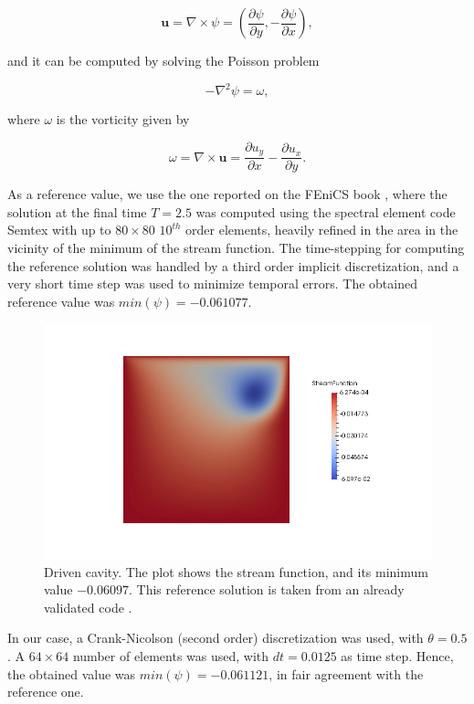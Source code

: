 \documentclass[a4paper,11pt,openright,twoside]{book}
\begin{document}
\[
\mathbf{u} = \nabla \times \psi = (\frac{\partial \psi}{\partial y} , - \frac{\partial \psi }{\partial x}),
\]

and it can be computed by solving the Poisson problem

\[
- \nabla^2 \psi = \omega,
\]

where $\omega$ is the vorticity given by

\[
\omega = \nabla \times \mathbf{u} = \frac{\partial u_y}{\partial x} - \frac{\partial u_x}{\partial y}.
\]


As a reference value, we use the one reported on the FEniCS book \cite{logg}, where the solution at the final time $T = 2.5$ was computed using the spectral element code Semtex with up to $80 \times 80$ $10^{th}$ order elements, heavily refined in the area in the vicinity of the minimum of the stream function. The time-stepping for computing the reference solution was handled by a third order implicit discretization, and a very short time step was used to minimize temporal errors.  The obtained reference value was $min(\psi) = -0.061 077$.

\begin{figure}[h!]
\centering
\includegraphics[width=\textwidth]{images/oyvind.png}
\vspace{-1cm}
\caption{Driven cavity. The plot shows the stream function, and its minimum value $-0.06097$. This reference solution is taken from an already validated code \cite{mortensen}.}
\end{figure}


In our case, a Crank-Nicolson (second order) discretization was used, with $\theta = 0.5$. A $64 \times 64$ number of elements was used, with $dt = 0.0125$ as time step. Hence, the obtained value was $min(\psi) = -0.061 121$, in fair agreement with the reference one. \\
\end{document}
